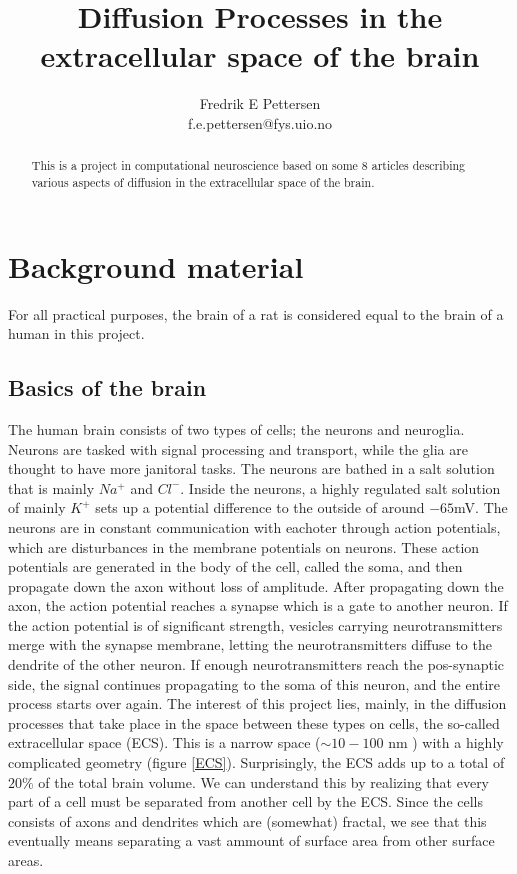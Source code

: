 \documentclass[a4paper,english, 12pt, twoside]{article}
\title{Diffusion Processes in the extracellular space of the brain}
\author{Fredrik E Pettersen\\ f.e.pettersen@fys.uio.no}
\begin{document}
\maketitle

\begin{abstract}
This is a project in computational neuroscience based on some 8 articles describing various aspects of diffusion in the extracellular space of the brain. 
\end{abstract}
\tableofcontents
\newpage
\section{Background material}
For all practical purposes, the brain of a rat is considered equal to the brain of a human in this project.
\subsection{Basics of the brain}

The human brain consists of two types of cells; the neurons and neuroglia. 
Neurons are tasked with signal processing and transport, while the glia are thought to have more janitoral tasks. 
The neurons are bathed in a salt solution that is mainly $Na^+$ and $Cl^-$. 
Inside the neurons, a highly regulated salt solution of mainly $K^+$ sets up a potential difference to the outside of around $-65$mV.
The neurons are in constant communication with eachoter through action potentials, which are disturbances in the membrane potentials on neurons. 
These action potentials are generated in the body of the cell, called the soma, and then propagate down the axon without loss of amplitude. 
After propagating down the axon, the action potential reaches a synapse which is a gate to another neuron. 
If the action potential is of significant strength, vesicles carrying neurotransmitters merge with the synapse membrane, letting the neurotransmitters diffuse to the dendrite of the other neuron. 
If enough neurotransmitters reach the pos-synaptic side, the signal continues propagating to the soma of this neuron, and the entire process starts over again. 
The interest of this project lies, mainly, in the diffusion processes that take place in the space between these types on cells, the so-called extracellular space (ECS). 
This is a narrow space ($\sim 10-100$ nm \cite{nicholson2001diffusion}) with a highly complicated geometry (figure \ref{ECS}). 
Surprisingly, the ECS adds up to a total of $20\%$ of the total brain volume. 
We can understand this by realizing that every part of a cell must be separated from another cell by the ECS. 
Since the cells consists of axons and dendrites which are (somewhat) fractal, we see that this eventually means separating a vast ammount of surface area from other surface areas.
\end{document}
